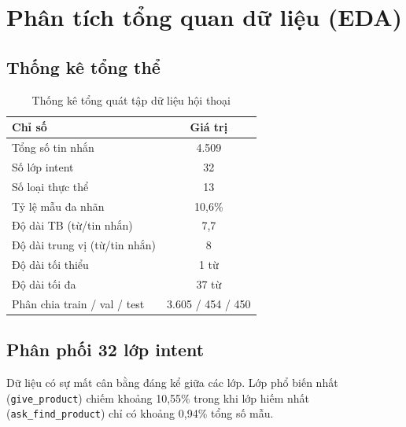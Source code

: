 \documentclass[12pt, a4paper]{report}
\begin{document}
\section{Phân tích tổng quan dữ liệu (EDA)}

\subsection{Thống kê tổng thể}

\begin{table}[H]
\centering
\caption{Thống kê tổng quát tập dữ liệu hội thoại}
\label{tab:data_stats}
\begin{tabular}{lc}
\toprule
\textbf{Chỉ số} & \textbf{Giá trị} \\
\midrule
Tổng số tin nhắn & 4.509 \\
Số lớp intent & 32 \\
Số loại thực thể & 13 \\
Tỷ lệ mẫu đa nhãn & 10,6\% \\
Độ dài TB (từ/tin nhắn) & 7,7 \\
Độ dài trung vị (từ/tin nhắn) & 8 \\
Độ dài tối thiểu & 1 từ \\
Độ dài tối đa & 37 từ \\
Phân chia train / val / test & 3.605 / 454 / 450 \\
\bottomrule
\end{tabular}
\end{table}

\subsection{Phân phối 32 lớp intent}

Dữ liệu có sự mất cân bằng đáng kể giữa các lớp.
Lớp phổ biến nhất (\texttt{give\_product}) chiếm khoảng 10,55\%
trong khi lớp hiếm nhất (\texttt{ask\_find\_product}) chỉ có
khoảng 0,94\% tổng số mẫu.
\end{document}
